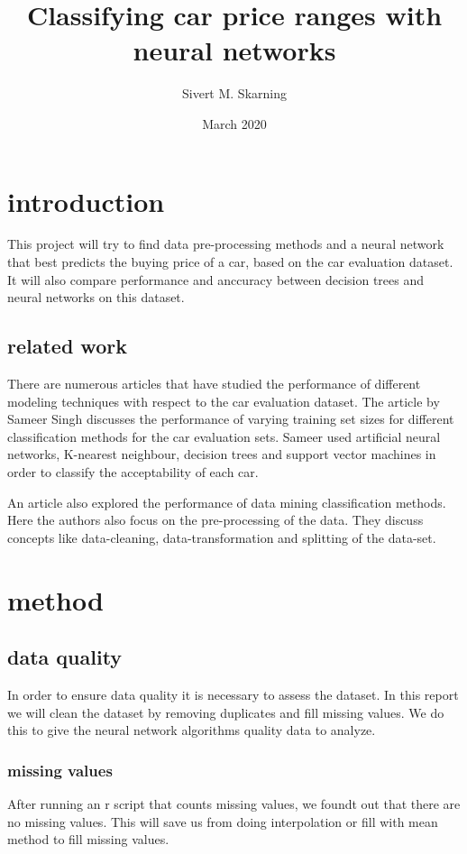\documentclass[a4paper, 12pt]{article}
\title{Classifying car price ranges with neural networks}
\author{Sivert M. Skarning}
\date{March 2020}
\begin{document}
\maketitle
\clearpage
\tableofcontents
\clearpage

\section{introduction}
This project will try to find data pre-processing methods and a neural network that best predicts the buying price of a car, based on the car evaluation dataset.
It will also compare performance and anccuracy between decision trees and neural networks on this dataset.
\subsection{related work}
There are numerous articles that have studied the performance of different modeling techniques with respect to the car evaluation dataset. The article by Sameer Singh\cite{singh2005modeling} discusses the performance of varying training set sizes for different classification methods for the car evaluation sets. Sameer used artificial neural networks, K-nearest neighbour, decision trees and support vector machines in order to classify the acceptability of each car.


An article\cite{perf} also explored the performance of data mining classification methods. Here the authors also focus on the pre-processing of the data. They discuss concepts like data-cleaning, data-transformation and splitting of the data-set.

\section{method}

\subsection{data quality}
In order to ensure data quality it is necessary to assess the dataset. In this report we will clean the dataset by removing duplicates and fill missing values. We do this to give the neural network algorithms quality data to analyze\cite{quality}.
\subsubsection{missing values}
After running an r script that counts missing values, we foundt out that there are no missing values. This will save us from doing interpolation or fill with mean method to fill missing values.
\end{document}
